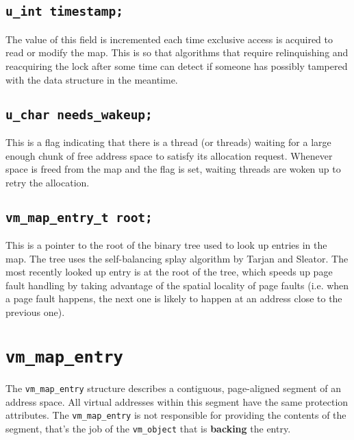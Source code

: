 \documentclass[shortabstract, english]{iithesis}
\begin{document}
\subsection*{\texttt{u_int timestamp;}}
The value of this field is incremented each time exclusive access is acquired to
read or modify the map. This is so that algorithms that require relinquishing
and reacquiring the lock after some time can detect if someone has possibly
tampered with the data structure in the meantime.

\subsection*{\texttt{u_char needs_wakeup;}}
This is a flag indicating that there is a thread (or threads) waiting for a
large enough chunk of free address space to satisfy its allocation request.
Whenever space is freed from the map and the flag is set, waiting threads are
woken up to retry the allocation.

\subsection*{\texttt{vm_map_entry_t root;}}
This is a pointer to the root of the binary tree used to look up entries in the
map. The tree uses the self-balancing splay algorithm by Tarjan and Sleator. The
most recently looked up entry is at the root of the tree, which speeds up page
fault handling by taking advantage of the spatial locality of page faults (i.e.
when a page fault happens, the next one is likely to happen at an address close
to the previous one).

\section{\texttt{vm_map_entry}}

The \texttt{vm_map_entry} structure describes a contiguous, page-aligned
segment of an address space. All virtual addresses within this segment have
the same protection attributes. The \texttt{vm_map_entry} is not responsible
for providing the contents of the segment, that's the job of the
\texttt{vm_object} that is \textbf{backing} the entry.
\end{document}
